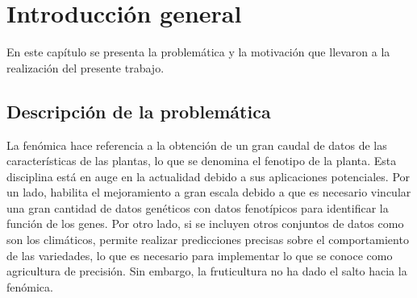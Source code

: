 
\chapter{Introducción general} %

\label{Chapter1} %
\label{IntroGeneral}


\newcommand{\keyword}[1]{\textbf{#1}}
\newcommand{\tabhead}[1]{\textbf{#1}}
\newcommand{\code}[1]{\texttt{#1}}
\newcommand{\file}[1]{\texttt{\bfseries#1}}
\newcommand{\option}[1]{\texttt{\itshape#1}}
\newcommand{\grados}{$^{\circ}$}




En este capítulo se presenta la problemática y la motivación que llevaron a la realización del presente trabajo.

\section{Descripción de la problemática}

La fenómica hace referencia a la obtención de un gran caudal de datos de las características de las plantas, lo que se denomina el fenotipo de la planta. Esta disciplina está en auge en la actualidad debido a sus aplicaciones potenciales. Por un lado, habilita el mejoramiento a gran escala debido a que es necesario vincular una gran cantidad de datos genéticos con datos fenotípicos para identificar la función de los genes. Por otro lado, si se incluyen otros conjuntos de datos como son los climáticos, permite realizar predicciones precisas sobre el comportamiento de las variedades, lo que es necesario para implementar lo que se conoce como agricultura de precisión. Sin embargo, la fruticultura no ha dado el salto hacia la fenómica.

